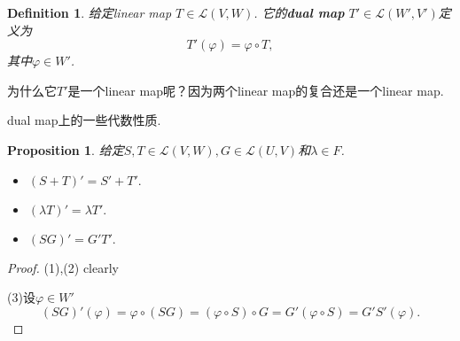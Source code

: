\documentclass{article}
\newtheorem{proposition}[theorem]{Proposition}
\newtheorem{definition}[theorem]{Definition}
\begin{document}
\begin{definition}
\rm 给定linear map $T \in \mathcal{L}(V,W)$. 它的\textbf{dual map} $T' \in \mathcal{L}(W',V')$定义为
$$
T'(\varphi) = \varphi \circ T,
$$
其中$\varphi \in W'$.
\end{definition}

{\color{blue} 为什么它$T'$是一个linear map呢？因为两个linear map的复合还是一个linear map}. 

{\color{red} dual map上的一些代数性质}.
\begin{proposition}
给定$S,T \in \mathcal{L}(V,W),G \in \mathcal{L}(U,V)$和$\lambda \in F$.
\begin{itemize}
	\item $(S+T)' = S' + T'.$
	\item $(\lambda T)' = \lambda T'.$
	\item $(SG)' = G'T'.$
\end{itemize}
\end{proposition}

\begin{proof}
(1),(2) clearly

(3)设$\varphi \in W'$
$$
(SG)'(\varphi) = \varphi \circ (SG) = (\varphi \circ S) \circ G = G'(\varphi \circ S) = G'S'(\varphi).
$$
\end{proof}
\end{document}
